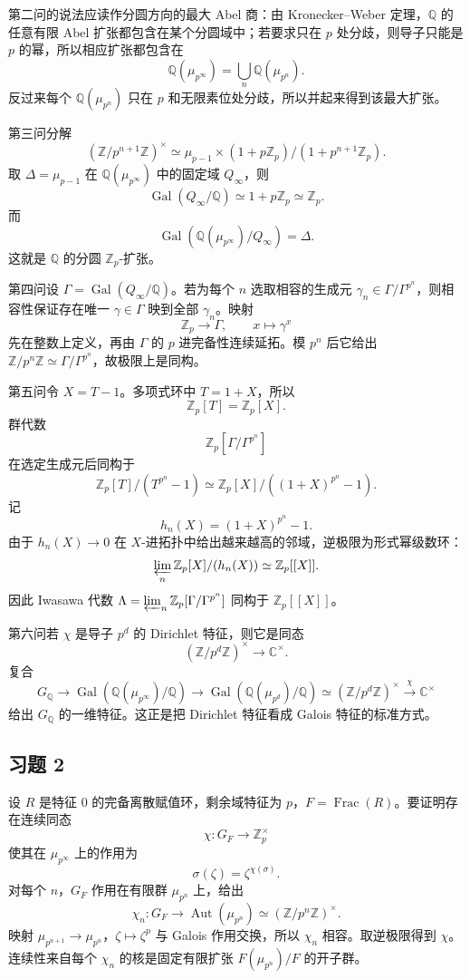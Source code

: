 \documentclass[11pt,a4paper,openany]{ctexbook}
\numberwithin{equation}{chapter}
\newcommand{\Q}{\mathbb{Q}}
\newcommand{\C}{\mathbb{C}}
\newcommand{\Z}{\mathbb{Z}}
\newcommand{\Gal}{\operatorname{Gal}}
\theoremstyle{plain}
\theoremstyle{definition}
\theoremstyle{remark}
\begin{document}
第二问的说法应读作分圆方向的最大 Abel 商：由 Kronecker--Weber 定理，$\Q$ 的任意有限 Abel 扩张都包含在某个分圆域中；若要求只在 $p$ 处分歧，则导子只能是 $p$ 的幂，所以相应扩张都包含在
\[
\Q(\mu_{p^\infty})=\bigcup_n\Q(\mu_{p^n}).
\]
反过来每个 $\Q(\mu_{p^n})$ 只在 $p$ 和无限素位处分歧，所以并起来得到该最大扩张。

第三问分解
\[
(\Z/p^{n+1}\Z)^\times\simeq \mu_{p-1}\times(1+p\Z_p)/(1+p^{n+1}\Z_p).
\]
取 $\Delta=\mu_{p-1}$ 在 $\Q(\mu_{p^\infty})$ 中的固定域 $Q_\infty$，则
\[
\Gal(Q_\infty/\Q)\simeq 1+p\Z_p\simeq \Z_p.
\]
而
\[
\Gal(\Q(\mu_{p^\infty})/Q_\infty)=\Delta.
\]
这就是 $\Q$ 的分圆 $\Z_p$-扩张。

第四问设 $\Gamma=\Gal(Q_\infty/\Q)$。若为每个 $n$ 选取相容的生成元 $\gamma_n\in \Gamma/\Gamma^{p^n}$，则相容性保证存在唯一 $\gamma\in\Gamma$ 映到全部 $\gamma_n$。映射
\[
\Z_p\to\Gamma,\qquad x\mapsto \gamma^x
\]
先在整数上定义，再由 $\Gamma$ 的 $p$ 进完备性连续延拓。模 $p^n$ 后它给出 $\Z/p^n\Z\simeq\Gamma/\Gamma^{p^n}$，故极限上是同构。

第五问令 $X=T-1$。多项式环中 $T=1+X$，所以
\[
\Z_p[T]=\Z_p[X].
\]
群代数
\[
\Z_p[\Gamma/\Gamma^{p^n}]
\]
在选定生成元后同构于
\[
\Z_p[T]/(T^{p^n}-1)
\simeq \Z_p[X]/((1+X)^{p^n}-1).
\]
记
\[
h_n(X)=(1+X)^{p^n}-1.
\]
由于 $h_n(X)\to 0$ 在 $X$-进拓扑中给出越来越高的邻域，逆极限为形式幂级数环：
\[
\varprojlim_n\Z_p[X]/(h_n(X))\simeq \Z_p[[X]].
\]
因此 Iwasawa 代数 $\Lambda=\varprojlim_n\Z_p[\Gamma/\Gamma^{p^n}]$ 同构于 $\Z_p[[X]]$。

第六问若 $\chi$ 是导子 $p^d$ 的 Dirichlet 特征，则它是同态
\[
(\Z/p^d\Z)^\times\to\C^\times.
\]
复合
\[
G_\Q\to\Gal(\Q(\mu_{p^\infty})/\Q)\to
\Gal(\Q(\mu_{p^d})/\Q)\simeq(\Z/p^d\Z)^\times\xrightarrow{\chi}\C^\times
\]
给出 $G_\Q$ 的一维特征。这正是把 Dirichlet 特征看成 Galois 特征的标准方式。

\subsection*{习题 2}

设 $R$ 是特征 $0$ 的完备离散赋值环，剩余域特征为 $p$，$F=\operatorname{Frac}(R)$。要证明存在连续同态
\[
\chi:G_F\to \Z_p^\times
\]
使其在 $\mu_{p^\infty}$ 上的作用为
\[
\sigma(\zeta)=\zeta^{\chi(\sigma)}.
\]
对每个 $n$，$G_F$ 作用在有限群 $\mu_{p^n}$ 上，给出
\[
\chi_n:G_F\to\operatorname{Aut}(\mu_{p^n})\simeq(\Z/p^n\Z)^\times.
\]
映射 $\mu_{p^{n+1}}\to\mu_{p^n}$，$\zeta\mapsto\zeta^p$ 与 Galois 作用交换，所以 $\chi_n$ 相容。取逆极限得到 $\chi$。连续性来自每个 $\chi_n$ 的核是固定有限扩张 $F(\mu_{p^n})/F$ 的开子群。
\end{document}
